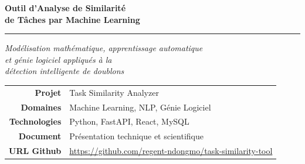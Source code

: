 \documentclass[12pt, a4paper]{article}
\begin{document}
\begin{titlepage}
  \begin{center}


    \vspace*{2cm}


    \vspace{1.5cm}

    \begin{tcolorbox}[
      enhanced, arc=8pt,
      colback=white, colframe=AIMSblue,
      boxrule=1.5pt,
      left=12pt, right=12pt, top=10pt, bottom=10pt,
      drop shadow={AIMSblue!30}
    ]
    \begin{center}
      {\color{AIMSblue}\LARGE\bfseries\sffamily
        Outil d'Analyse de Similarité\\[0.3cm]
        de Tâches par Machine Learning}

      \vspace{0.5cm}
      \color{codegray}\rule{0.6\textwidth}{0.5pt}
      \vspace{0.4cm}

      {\large\itshape
        Modélisation mathématique, apprentissage automatique\\
        et génie logiciel appliqués à la\\
        détection intelligente de doublons}
    \end{center}
    \end{tcolorbox}

    \vspace{1.5cm}

    \begin{tabular}{rl}
      \toprule
      \textbf{Projet} & Task Similarity Analyzer \\
      \textbf{Domaines} & Machine Learning, NLP, Génie Logiciel \\
      \textbf{Technologies} & Python, FastAPI, React, MySQL \\
      \textbf{Document} & Présentation technique et scientifique \\
      \textbf{URL Github} & \url{https://github.com/regent-ndongmo/task-similarity-tool}} \\
      \bottomrule
    \end{tabular}


\end{center}
\end{titlepage}
\end{document}
